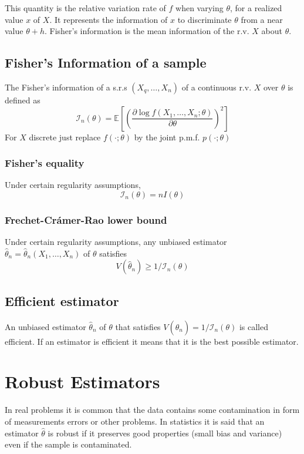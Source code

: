 This quantity is the relative variation rate of $f$ when varying $\theta$, for a
realized value $x$ of $X$. It represents the information of $x$ to discriminate
$\theta$ from a near value $\theta+h$. Fisher’s information is the mean
information of the r.v. $X$ about $\theta$.

\subsection{Fisher's Information of a sample}
The Fisher's information of a s.r.s $(X_q,\dots,X_n)$ of a continuous r.v. $X$
over $\theta$ is defined as
\[ \mathcal{I}_n(\theta) = \mathbb{E}\left[\left(\frac{\partial\log
f(X_1,\dots,X_n;\theta)}{\partial\theta}\right)^2\right] \] For $X$ discrete
just replace $f(\cdot;\theta)$ by the joint p.m.f. $p(\cdot;\theta)$

\subsubsection{Fisher's equality}
Under certain regularity assumptions,
\[ \mathcal{I}_n(\theta) = nI(\theta) \]

\subsubsection{Frechet-Cr\'amer-Rao lower bound}
Under certain regularity assumptions, any
unbiased estimator $\hat{\theta}_n=\hat{\theta}_n(X_1,\dots,X_n)$ of $\theta$
satisfies
\[ V(\hat{\theta}_n) \geq 1 / \mathcal{I}_n(\theta)\]

\subsection{Efficient estimator}
An unbiased estimator $\hat{\theta}_n$ of $\theta$ that satisfies
$V(\hat{\theta}_n)=1 / \mathcal{I}_n(\theta)$ is called efficient. If an
estimator is efficient it means that it is the best possible estimator.

\section{Robust Estimators}
In real problems it is common that the data contains some contamination in form
of measurements errors or other problems. In statistics it is said that an
estimator $\hat{\theta}$ is robust if it preserves good properties (small bias
and variance) even if the sample is contaminated.

